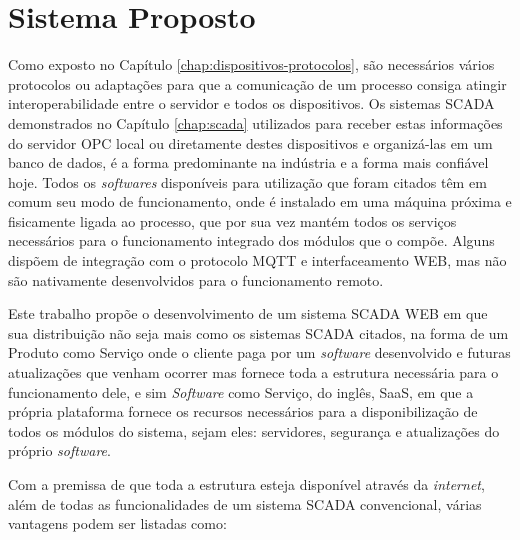 \chapter{Sistema Proposto}
\label{chap:sistema-proposto}

Como exposto no Capítulo \ref{chap:dispositivos-protocolos}, são necessários vários protocolos ou adaptações para que a comunicação de um processo consiga atingir interoperabilidade entre o servidor e todos os dispositivos. Os sistemas \gls{SCADA} demonstrados no Capítulo \ref{chap:scada} utilizados para receber estas informações do servidor \gls{OPC} local ou diretamente destes dispositivos e organizá-las em um banco de dados, é a forma predominante na indústria e a forma mais confiável hoje. Todos os \textit{softwares} disponíveis para utilização que foram citados têm em comum seu modo de funcionamento, onde é instalado em uma máquina próxima e fisicamente ligada ao processo, que por sua vez mantém todos os serviços necessários para o funcionamento integrado dos módulos que o compõe. Alguns dispõem de integração com o protocolo \gls{MQTT} e interfaceamento \gls{WEB}, mas não são nativamente desenvolvidos para o funcionamento remoto.

Este trabalho propõe o desenvolvimento de um sistema \gls{SCADA} \gls{WEB} em que sua distribuição não seja mais como os sistemas \gls{SCADA} citados, na forma de um Produto como Serviço onde o cliente paga por um \textit{software} desenvolvido e futuras atualizações que venham ocorrer mas fornece toda a estrutura necessária para o funcionamento dele, e sim \textit{Software} como Serviço, do inglês, \gls{SaaS}, em que a própria plataforma fornece os recursos necessários para a disponibilização de todos os módulos do sistema, sejam eles: servidores, segurança e atualizações do próprio \textit{software}.

Com a premissa de que toda a estrutura esteja disponível através da \textit{internet}, além de todas as funcionalidades de um sistema \gls{SCADA} convencional, várias vantagens podem ser listadas como:

